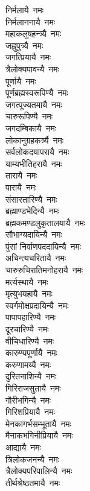 \begin{multicols}{2}
\begin{flushleft}
निर्मलायै~नमः\hfill{}\\
निर्मलाननायै~नमः\\
महाकलुषहन्त्र्यै~नमः\\
जह्नुपुत्र्यै~नमः\\
जगत्प्रियायै~नमः\\
त्रैलोक्यपावन्यै~नमः\\
पूर्णायै~नमः\\
पूर्णब्रह्मस्वरूपिण्यै~नमः\\
जगत्पूज्यतमायै~नमः\\
चारुरूपिण्यै~नमः\\
जगदम्बिकायै~नमः\hfill{}\\
लोकानुग्रहकर्त्र्यै~नमः\\
सर्वलोकदयापरायै~नमः\\
याम्यभीतिहरायै~नमः\\
तारायै~नमः\\
पारायै~नमः\\
संसारतारिण्यै~नमः\\
ब्रह्माण्डभेदिन्यै~नमः\\
ब्रह्मकमण्डलुकृतालयायै~नमः\\
सौभाग्यदायिन्यै~नमः\\
पुंसां निर्वाणपददायिन्यै~नमः\hfill{}\\
अचिन्त्यचरितायै~नमः\\
चारुरुचिरातिमनोहरायै~नमः\\
मर्त्यस्थायै~नमः\\
मृत्युभयहायै~नमः\\
स्वर्गमोक्षप्रदायिन्यै~नमः\\
पापापहारिण्यै~नमः\\
दूरचारिण्यै~नमः\\
वीचिधारिण्यै~नमः\\
कारुण्यपूर्णायै~नमः\\
करुणामय्यै~नमः\hfill{}\\
दुरितनाशिन्यै~नमः\\
गिरिराजसुतायै~नमः\\
गौरीभगिन्यै~नमः\\
गिरिशप्रियायै~नमः\\
मेनकागर्भसम्भूतायै~नमः\\
मैनाकभगिनीप्रियायै~नमः\\
आद्यायै~नमः\\
त्रिलोकजनन्यै~नमः\\
त्रैलोक्यपरिपालिन्यै~नमः\\
तीर्थश्रेष्ठतमायै~नमः\hfill{}\\

\end{flushleft}
\end{multicols}
